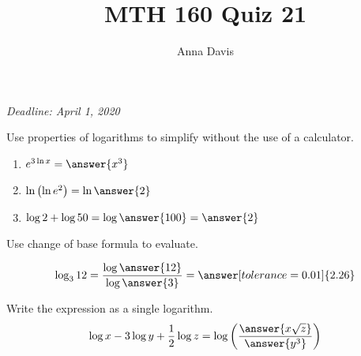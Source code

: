 \documentclass{ximera}
\author{Anna Davis} \title{MTH 160 Quiz 21}
\begin{document}
\begin{abstract}

\end{abstract}
\maketitle
 \textit{Deadline: April 1, 2020}
\begin{problem}\label{prob:quiz20prob1}
Use properties of logarithms to simplify without the use of a calculator.
\begin{enumerate}
    \item $e^{3\ln x}=\answer{x^3}$
    \item $\ln\left(\ln e^2\right)=\ln\answer{2}$
    \item $\log 2 +\log 50=\log \answer{100}=\answer{2}$
\end{enumerate}
\end{problem}

\begin{problem}\label{prob:quiz20prob2}
Use change of base formula to evaluate. 

$$\log_3 12=\frac{\log\answer{12}}{\log\answer{3}}=\answer[tolerance=0.01]{2.26}$$
\end{problem}

\begin{problem}\label{prob:quiz20prob3}
Write the expression as a single logarithm.
$$\log x-3\log y+\frac{1}{2}\log z=\log\left(\frac{\answer{x\sqrt{z}}}{\answer{y^3}}\right)$$
\end{problem}
\end{document}
